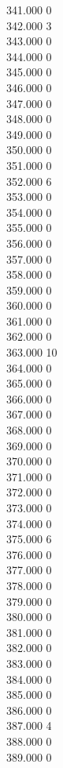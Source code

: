 { 341.000	0 \\
 342.000	3 \\
 343.000	0 \\
 344.000	0 \\
 345.000	0 \\
 346.000	0 \\
 347.000	0 \\
 348.000	0 \\
 349.000	0 \\
 350.000	0 \\
 351.000	0 \\
 352.000	6 \\
 353.000	0 \\
 354.000	0 \\
 355.000	0 \\
 356.000	0 \\
 357.000	0 \\
 358.000	0 \\
 359.000	0 \\
 360.000	0 \\
 361.000	0 \\
 362.000	0 \\
 363.000	10 \\
 364.000	0 \\
 365.000	0 \\
 366.000	0 \\
 367.000	0 \\
 368.000	0 \\
 369.000	0 \\
 370.000	0 \\
 371.000	0 \\
 372.000	0 \\
 373.000	0 \\
 374.000	0 \\
 375.000	6 \\
 376.000	0 \\
 377.000	0 \\
 378.000	0 \\
 379.000	0 \\
 380.000	0 \\
 381.000	0 \\
 382.000	0 \\
 383.000	0 \\
 384.000	0 \\
 385.000	0 \\
 386.000	0 \\
 387.000	4 \\
 388.000	0 \\
 389.000	0 \\
}
